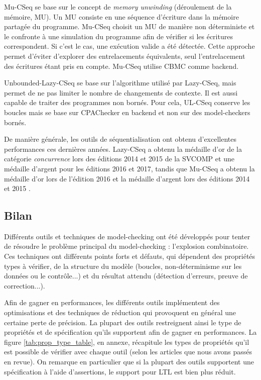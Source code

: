 Mu-CSeq\cite{MuCSeq} se base sur le concept de \emph{memory
unwinding} (déroulement de la mémoire, MU). Un MU consiste en une
séquence d'écriture dans la mémoire partagée du programme. Mu-CSeq
choisit un MU de manière non déterministe et le confronte à une
simulation du programme afin de vérifier si les écritures correspondent.
Si c'est le cas, une exécution valide a été détectée. Cette approche
permet d'éviter d'explorer des entrelacements équivalents, seul l'entrelacement
des écritures étant pris en compte. Mu-CSeq utilise CBMC comme backend.

Unbounded-Lazy-CSeq\cite{ULCSeq} se base sur l'algorithme utilisé
par Lazy-CSeq, mais permet de ne pas limiter le nombre de changements de
contexte. Il est aussi capable de traiter des programmes non bornés.
Pour cela, UL-CSeq conserve les boucles mais se base sur
CPAChecker\cite{CPAChecker} en backend et non sur des model-checkers bornés.

De manière générale, les outils de séquentialisation ont obtenu
d'excellentes performances ces dernières années. Lazy-CSeq a obtenu la
médaille d'or de la catégorie \emph{concurrence} lors des éditions 2014
et 2015 de la SVCOMP et une médaille d'argent pour les éditions 2016 et
2017, tandis que Mu-CSeq a obtenu la médaille d'or lors de l'édition
2016 et la médaille d'argent lors des éditions 2014 et 2015
\cite{svcomp_2016_result, svcomp_2015_result,
svcomp_2014_result, svcomp_2017_result}.

\subsection{Bilan}

Différents outils et techniques de model-checking ont été développés pour
tenter de résoudre le problème principal du model-checking : l'explosion
combinatoire. Ces techniques ont différents points forts et défauts, qui
dépendent des propriétés types à vérifier, de la structure du modèle (boucles,
non-déterminisme sur les données ou  le contrôle...) et du résultat attendu
(détection d'erreurs, preuve de correction...).

Afin de gagner en performances, les différents outils implémentent des
optimisations et des techniques de réduction qui provoquent en général une
certaine perte de précision. La plupart des outils restreignent ainsi le type de
propriétés et de spécification qu'ils supportent afin de gagner en performances.
La figure \ref{tab:prop_type_table}, en annexe, récapitule les types de
propriétés qu'il est possible de vérifier avec chaque outil (selon les articles
que nous avons passés en revue). On remarque en particulier que si la plupart
des outils supportent une spécification à l'aide d'assertions, le support pour
\ac{LTL} est bien plus réduit.

